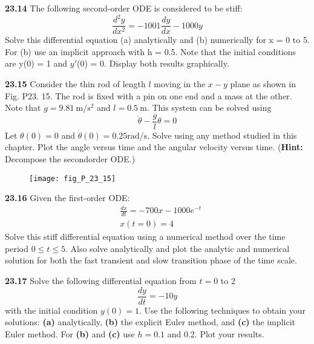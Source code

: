\documentclass[../main.tex]{subfiles}
\begin{document}
\begin{multicols}{2}
    \noindent\textbf{23.14} The following second-order ODE is considered to be stiff:
    $$
    \frac{d^{2} y}{d x^{2}}=-1001 \frac{d y}{d x}-1000 y
    $$
    Solve this differential equation (a) analytically and 
    (b) numerically for x = 0 to 5. For (b) use an implicit
    approach with h = 0.5. Note that the initial conditions are
    y(0) = 1 and $y'$(0) = 0. Display both results graphically.\vspace{2mm}

    \noindent\textbf{23.15} Consider the thin rod of length $l$ moving in the $x-y$ plane as shown in Fig. P23. 15. The rod is fixed with a pin on one end and a mass at the other. Note that $g=9.81 \mathrm{~m} / \mathrm{s}   ^{2}$ and $l=0.5 \mathrm{~m}$. This system can be solved using
    $$
    \ddot{\theta}-\frac{g}{l} \theta=0
    $$
    Let $\theta(0)=0$ and $\dot{\theta}(0)=0.25 \mathrm{rad} / \mathrm{s}$. Solve using any method studied in   this chapter. Plot the angle versus time and the angular velocity versus time. (\textbf{Hint:} Decompose the  secondorder ODE.)

    \begin{figure}[H]
        \centering
        \texttt{[image: fig\_P\_23\_15]}
        \caption{\textsf{}}
        \label{fig:fig_P_23_15} %
    \end{figure}\vspace{2mm}

    \noindent\textbf{23.16} Given the first-order ODE:
    $$
    \begin{aligned}
    &\frac{d x}{d t}=-700 x-1000 e^{-t} \\
    &x(t=0)=4
    \end{aligned}
    $$
    Solve this stiff differential equation using a numerical method over the time period $0 \leq t \leq 5$. Also    solve analytically and plot the analytic and numerical solution for both the fast transient and slow   transition phase of the time scale.\vspace{2mm}

    \noindent\textbf{23.17} Solve the following differential equation from $t=0$ to 2
    $$
    \frac{d y}{d t}=-10 y
    $$
    with the initial condition $y(0)=1$. Use the following techniques to obtain your solutions: \textbf{(a)}    analytically, \textbf{(b)} the explicit Euler method, and \textbf{(c)} the implicit Euler method. For \textbf{ (b)} and \textbf{(c)} use $h=0.1$ and 0.2. Plot your results.\vspace{2mm}


\end{multicols}
\end{document}
